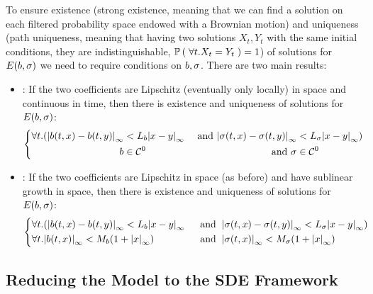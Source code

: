 To ensure existence (strong existence, meaning that we can find a solution on each filtered probability space endowed with a Brownian motion) and uniqueness (path uniqueness, meaning that having two solutions $X_t, Y_t$ with the same initial conditions, they are indistinguishable, \ie $\mathbb{P} \left( \;  \forall	t. X_t = Y_t  \; \right)=1 $) of solutions for $E(b, \sigma)$ we need to require conditions on $b, \sigma$. There are two main results:
\begin{itemize}
\item \autocite[Thm 8.3]{le-gall}: If the two coefficients are Lipschitz (eventually only locally) in space and continuous in time, then there is existence and uniqueness of solutions for $E(b, \sigma)$:
\begin{equation*}\label{ch2:cond:E-and-U-lipsch+c-0-in-time}
\left\{
\begin{aligned}
\forall t .( { \left| b(t, x)-b(t,y) \right|_{\infty} } &< L_b { \left| x-y \right|_{\infty} } &\text{ and } { \left| \sigma(t, x)-\sigma(t,y) \right|_{\infty} } &< L_\sigma { \left| x-y \right|_{\infty} }) \\
b &\in \mathcal{C}^0 &\text{ and }\sigma &\in \mathcal{C}^0
\end{aligned}
\right.
\end{equation*}
\item \autocite[Thm 9.4]{baldi}: If the two coefficients are Lipschitz in space (as before) and have sublinear growth in space, then there is existence and uniqueness of solutions for $E(b, \sigma)$:
\begin{equation*}\label{ch2:cond:E-and-U-lipsch+subgrowth}
\left\{
\begin{aligned}
&\forall t .({ \left| b(t, x)-b(t,y) \right|_{\infty} } < L_b { \left| x-y \right|_{\infty} }
&\:\text{ and }\:
&{ \left| \sigma(t, x)-\sigma(t,y) \right|_{\infty} } < L_\sigma { \left| x-y \right|_{\infty} }) 
\\
&\forall t .{ \left| b(t, x) \right|_{\infty} } < M_b(1 + { \left| x \right|_{\infty} }) 
&\:\text{ and }\:
&{ \left| \sigma(t, x) \right|_{\infty} } < M_\sigma (1 + { \left| x \right|_{\infty} })
\end{aligned}
\right.
\end{equation*}
\end{itemize}

\subsection{Reducing the Model to the SDE Framework}

